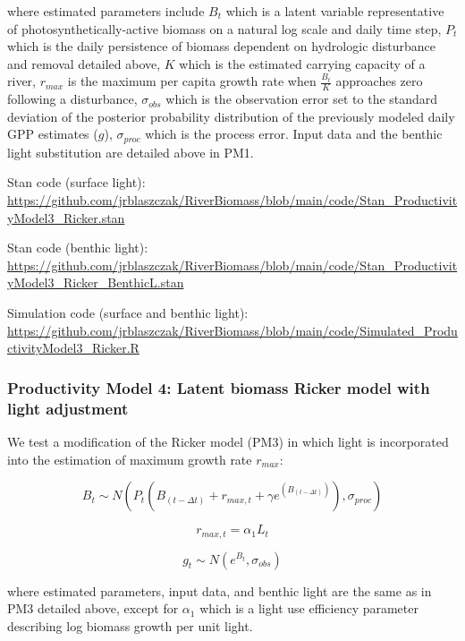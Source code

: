 \documentclass[]{article}
\begin{document}
where estimated parameters include \(B_{t}\) which is a latent variable
representative of photosynthetically-active biomass on a natural log
scale and daily time step, \(P_{t}\) which is the daily persistence of
biomass dependent on hydrologic disturbance and removal detailed above,
\(K\) which is the estimated carrying capacity of a river, \(r_{max}\)
is the maximum per capita growth rate when \(\frac {B_t}{K}\) approaches
zero following a disturbance, \(\sigma_{obs}\) which is the observation
error set to the standard deviation of the posterior probability
distribution of the previously modeled daily GPP estimates (\(g\)),
\(\sigma_{proc}\) which is the process error. Input data and the benthic
light substitution are detailed above in PM1.

Stan code (surface light):
\url{https://github.com/jrblaszczak/RiverBiomass/blob/main/code/Stan_ProductivityModel3_Ricker.stan}

Stan code (benthic light):
\url{https://github.com/jrblaszczak/RiverBiomass/blob/main/code/Stan_ProductivityModel3_Ricker_BenthicL.stan}

Simulation code (surface and benthic light):
\url{https://github.com/jrblaszczak/RiverBiomass/blob/main/code/Simulated_ProductivityModel3_Ricker.R}

\subsubsection{Productivity Model 4: Latent biomass Ricker model with
light
adjustment}\label{productivity-model-4-latent-biomass-ricker-model-with-light-adjustment}

We test a modification of the Ricker model (PM3) in which light is
incorporated into the estimation of maximum growth rate \(r_{max}\):

\begin{equation}
    B_{t} \sim N(P_{t}(B_{(t-\Delta t)} + r_{max,t} + \gamma e^{(B_{(t-\Delta t)})}), \sigma_{proc})
\end{equation}

\begin{equation}
    r_{max,t} = \alpha_{1}L_{t}
\end{equation}

\begin{equation}
    g_{t} \sim N(e^{B_{t}},\sigma_{obs})
\end{equation}

where estimated parameters, input data, and benthic light are the same
as in PM3 detailed above, except for \(\alpha_1\) which is a light use
efficiency parameter describing log biomass growth per unit light.
\end{document}
